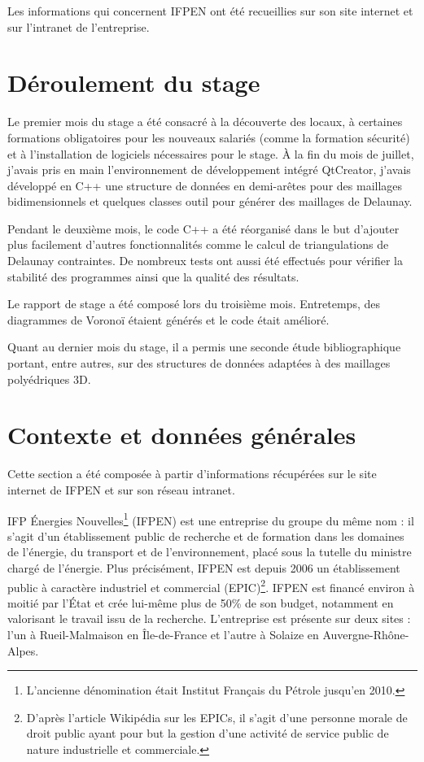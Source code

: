 \documentclass[12pt,a4paper]{report}
\begin{document}
Les informations qui concernent IFPEN ont été recueillies sur son site internet et sur l'intranet de l'entreprise.

\newpage
\section{Déroulement du stage}
Le premier mois du stage a été consacré à la découverte des locaux, à certaines formations obligatoires pour les nouveaux salariés (comme la formation sécurité) et à l'installation de logiciels nécessaires pour le stage. \`A la fin du mois de juillet, j'avais pris en main l'environnement de développement intégré QtCreator, j'avais développé en C++ une structure de données en demi-arêtes pour des maillages bidimensionnels et quelques classes outil pour générer des maillages de Delaunay.

Pendant le deuxième mois, le code C++ a été réorganisé dans le but d'ajouter plus facilement d'autres fonctionnalités comme le calcul de triangulations de Delaunay contraintes. De nombreux tests ont aussi été effectués pour vérifier la stabilité des programmes ainsi que la qualité des résultats.

Le rapport de stage a été composé lors du troisième mois. Entretemps, des diagrammes de Voronoï étaient générés et le code était amélioré.

Quant au dernier mois du stage, il a permis une seconde étude bibliographique portant, entre autres, sur des structures de données adaptées à des maillages polyédriques 3D.

\newpage
\section{Contexte et données générales}
Cette section a été composée à partir d'informations récupérées sur le site internet de IFPEN et sur son réseau intranet.
\vspace{1cm}

IFP \'Energies Nouvelles\footnote{L'ancienne dénomination était Institut Français du Pétrole jusqu'en 2010.} (IFPEN) est une entreprise du groupe du même nom : il s'agit d'un établissement public de recherche et de formation dans les domaines de l'énergie, du transport et de l'environnement, placé sous la tutelle du ministre chargé de l'énergie. Plus précisément, IFPEN est depuis 2006 un établissement public à caractère industriel et commercial (EPIC)\footnote{D'après l'article Wikipédia sur les EPICs, il s'agit \og d'une personne morale de droit public ayant pour but la gestion d'une activité de service public de nature industrielle et commerciale\fg{}.}. IFPEN est financé environ à moitié par l'\'Etat et crée lui-même plus de 50\% de son budget, notamment en valorisant le travail issu de la recherche. L'entreprise est présente sur deux sites : l'un à Rueil-Malmaison en \^Ile-de-France et l'autre à Solaize en Auvergne-Rhône-Alpes.
\end{document}
